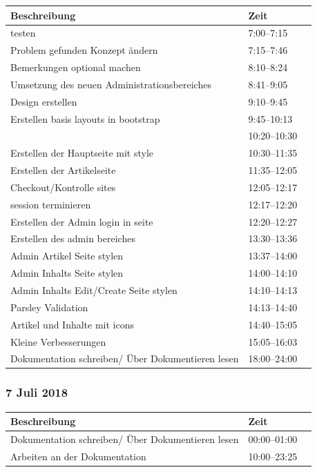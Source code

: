 \documentclass[a4paper, 11pt]{article}
\begin{document}
\begin{tabular}{llr}
\toprule
Beschreibung & Zeit \\
\midrule
testen & 7:00--7:15 \\
Problem gefunden Konzept ändern & 7:15--7:46 \\
Bemerkungen optional machen & 8:10--8:24 \\
Umsetzung des neuen Administrationsbereiches & 8:41--9:05 \\
Design erstellen & 9:10--9:45 \\
Erstellen basis layouts in bootstrap & 9:45--10:13 \\
 & 10:20--10:30 \\
Erstellen der Hauptseite mit style & 10:30--11:35 \\
Erstellen der Artikelseite & 11:35--12:05 \\
Checkout/Kontrolle sites & 12:05--12:17 \\
session terminieren & 12:17--12:20 \\
Erstellen der Admin login in seite & 12:20--12:27 \\
Erstellen des admin bereiches & 13:30--13:36 \\
Admin Artikel Seite stylen & 13:37--14:00 \\
Admin Inhalts Seite stylen & 14:00--14:10 \\
Admin Inhalts Edit/Create Seite stylen & 14:10--14:13 \\
Parsley Validation & 14:13--14:40 \\
Artikel und Inhalte mit icons & 14:40--15:05 \\
Kleine Verbesserungen & 15:05--16:03 \\
Dokumentation schreiben/ Über Dokumentieren lesen & 18:00--24:00 \\
\bottomrule
\end{tabular}

\subsubsection{7 Juli 2018}

\begin{tabular}{llr}
\toprule
Beschreibung & Zeit \\
\midrule
Dokumentation schreiben/ Über Dokumentieren lesen & 00:00--01:00 \\
Arbeiten an der Dokumentation & 10:00--23:25 \\
\bottomrule
\end{tabular}
\end{document}
